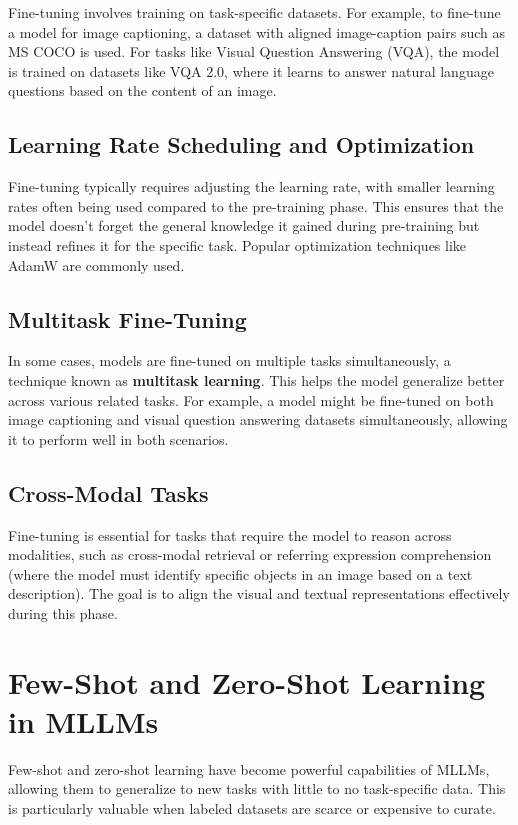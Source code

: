 Fine-tuning involves training on task-specific datasets. For example, to fine-tune a model for image captioning, a dataset with aligned image-caption pairs such as MS COCO is used. For tasks like Visual Question Answering (VQA), the model is trained on datasets like VQA 2.0, where it learns to answer natural language questions based on the content of an image.

\subsection{Learning Rate Scheduling and Optimization}

Fine-tuning typically requires adjusting the learning rate, with smaller learning rates often being used compared to the pre-training phase. This ensures that the model doesn’t forget the general knowledge it gained during pre-training but instead refines it for the specific task. Popular optimization techniques like AdamW are commonly used.

\subsection{Multitask Fine-Tuning}

In some cases, models are fine-tuned on multiple tasks simultaneously, a technique known as \textbf{multitask learning}. This helps the model generalize better across various related tasks. For example, a model might be fine-tuned on both image captioning and visual question answering datasets simultaneously, allowing it to perform well in both scenarios.

\subsection{Cross-Modal Tasks}

Fine-tuning is essential for tasks that require the model to reason across modalities, such as cross-modal retrieval or referring expression comprehension (where the model must identify specific objects in an image based on a text description). The goal is to align the visual and textual representations effectively during this phase.

\section{Few-Shot and Zero-Shot Learning in MLLMs}

Few-shot and zero-shot learning have become powerful capabilities of MLLMs, allowing them to generalize to new tasks with little to no task-specific data. This is particularly valuable when labeled datasets are scarce or expensive to curate.

